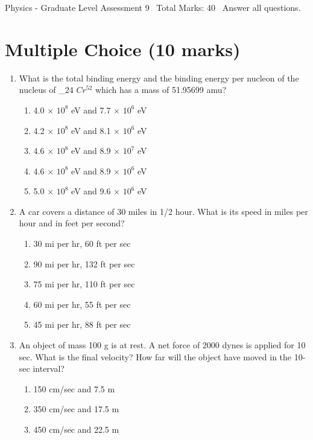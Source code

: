 \documentclass[12pt]{article}
\begin{document}
\begin{center}
Physics - Graduate Level Assessment 9 \
Total Marks: 40 \
Answer all questions.
\end{center}

\section*{Multiple Choice (10 marks)}
\begin{enumerate}[label=\arabic*.]
\item What is the total binding energy and the binding energy per nucleon of the nucleus of \_24 $Cr^52$ which has a mass of 51.95699 amu?
\begin{enumerate}[label=(\alph*)]
    \item 4.0 \ensuremath{\times} $10^8$ eV and 7.7 \ensuremath{\times} $10^6$ eV
    \item 4.2 \ensuremath{\times} $10^8$ eV and 8.1 \ensuremath{\times} $10^6$ eV
    \item 4.6 \ensuremath{\times} $10^8$ eV and 8.9 \ensuremath{\times} $10^7$ eV
    \item 4.6 \ensuremath{\times} $10^8$ eV and 8.9 \ensuremath{\times} $10^6$ eV
    \item 5.0 \ensuremath{\times} $10^8$ eV and 9.6 \ensuremath{\times} $10^6$ eV
\end{enumerate}
\item A car covers a distance of 30 miles in 1/2 hour. What is its speed in miles per hour and in feet per second?
\begin{enumerate}[label=(\alph*)]
    \item 30 mi per hr, 60 ft per sec
    \item 90 mi per hr, 132 ft per sec
    \item 75 mi per hr, 110 ft per sec
    \item 60 mi per hr, 55 ft per sec
    \item 45 mi per hr, 88 ft per sec
\end{enumerate}
\item An object of mass 100 g is at rest. A net force of 2000 dynes is applied for 10 sec. What is the final velocity? How far will the object have moved in the 10-sec interval?
\begin{enumerate}[label=(\alph*)]
    \item 150 cm/sec and 7.5 m
    \item 350 cm/sec and 17.5 m
    \item 450 cm/sec and 22.5 m

\end{enumerate}
\end{enumerate}
\end{document}
